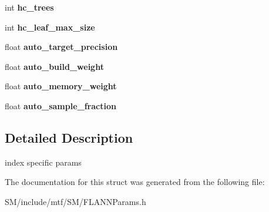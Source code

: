 \begin{DoxyCompactItemize}
\item 
\hypertarget{structFLANNParams_a4685ed96c9f4fae2c6338702a4d146e8}{int {\bfseries hc\-\_\-trees}}\label{structFLANNParams_a4685ed96c9f4fae2c6338702a4d146e8}

\item 
\hypertarget{structFLANNParams_ae3b9944272ef32b6f8424916902a1e04}{int {\bfseries hc\-\_\-leaf\-\_\-max\-\_\-size}}\label{structFLANNParams_ae3b9944272ef32b6f8424916902a1e04}

\item 
\hypertarget{structFLANNParams_a7e05b162ce147720c06c5c60ccf4362f}{float {\bfseries auto\-\_\-target\-\_\-precision}}\label{structFLANNParams_a7e05b162ce147720c06c5c60ccf4362f}

\item 
\hypertarget{structFLANNParams_ad723f8dbdcc2b6be72532164acea50e5}{float {\bfseries auto\-\_\-build\-\_\-weight}}\label{structFLANNParams_ad723f8dbdcc2b6be72532164acea50e5}

\item 
\hypertarget{structFLANNParams_ae760471bcbd6ba3ad13c3c2fe938c51b}{float {\bfseries auto\-\_\-memory\-\_\-weight}}\label{structFLANNParams_ae760471bcbd6ba3ad13c3c2fe938c51b}

\item 
\hypertarget{structFLANNParams_ac657687b62df6c4ecf650aac27eef00d}{float {\bfseries auto\-\_\-sample\-\_\-fraction}}\label{structFLANNParams_ac657687b62df6c4ecf650aac27eef00d}

\end{DoxyCompactItemize}


\subsection{Detailed Description}
index specific params 

The documentation for this struct was generated from the following file\-:\begin{DoxyCompactItemize}
\item 
S\-M/include/mtf/\-S\-M/F\-L\-A\-N\-N\-Params.\-h\end{DoxyCompactItemize}
